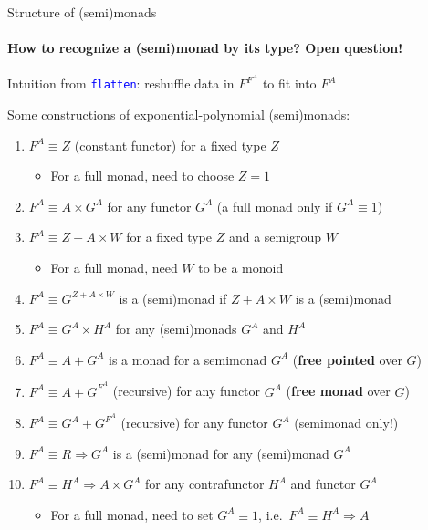\documentclass[english]{beamer}
\begin{document}
\begin{frame}{Structure of (semi)monads}


\framesubtitle{How to recognize a (semi)monad by its type? Open question!}

Intuition from \texttt{\textcolor{blue}{\footnotesize{}flatten}}:
reshuffle data in $F^{F^{A}}$ to fit into $F^{A}$

Some constructions of exponential-polynomial (semi)monads:
\begin{enumerate}
\item $F^{A}\equiv Z$ (constant functor) for a fixed type $Z$
\begin{itemize}
\item For a full monad, need to choose $Z=1$ 
\end{itemize}
\item $F^{A}\equiv A\times G^{A}$ for any functor $G^{A}$ (a full monad
only if $G^{A}\equiv1$)
\item $F^{A}\equiv Z+A\times W$ for a fixed type $Z$ and a semigroup $W$
\begin{itemize}
\item For a full monad, need $W$ to be a monoid
\end{itemize}
\item $F^{A}\equiv G^{Z+A\times W}$ is a (semi)monad if $Z+A\times W$
is a (semi)monad
\item $F^{A}\equiv G^{A}\times H^{A}$ for any (semi)monads $G^{A}$ and
$H^{A}$
\item $F^{A}\equiv A+G^{A}$ is a monad for a semimonad $G^{A}$ (\textbf{free
pointed} over $G$)
\item $F^{A}\equiv A+G^{F^{A}}$ (recursive) for any functor $G^{A}$ (\textbf{free
monad} over $G$)
\item $F^{A}\equiv G^{A}+G^{F^{A}}$ (recursive) for any functor $G^{A}$
(semimonad only!)
\item $F^{A}\equiv R\Rightarrow G^{A}$ is a (semi)monad for any (semi)monad
$G^{A}$
\item $F^{A}\equiv H^{A}\Rightarrow A\times G^{A}$ for any contrafunctor
$H^{A}$ and functor $G^{A}$
\begin{itemize}
\item For a full monad, need to set $G^{A}\equiv1$, i.e.\ $F^{A}\equiv H^{A}\Rightarrow A$
\end{itemize}
\end{enumerate}
\end{frame}
\end{document}
